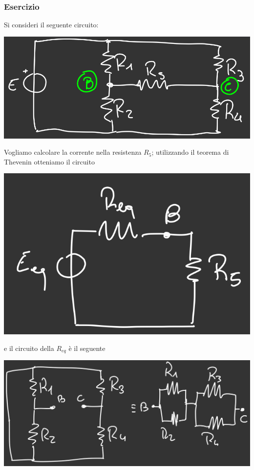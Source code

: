 \documentclass{article}
\begin{document}
\subsubsection{Esercizio}
Si consideri il seguente circuito:
\begin{center}
    \includegraphics[scale=0.33]{Image/Esercizio_Thevenin_1.png}
\end{center}
Vogliamo calcolare la corrente nella resistenza $R_5$; utilizzando il teorema di Thevenin otteniamo il circuito
\begin{center}
    \includegraphics[scale=0.33]{Image/Esercizio_Thevenin_2.png}
\end{center}
e il circuito della $R_{eq}$ è il seguente
\begin{center}
    \includegraphics[scale=0.33]{Image/Esercizio_Thevenin_3.png}
\end{center}
\end{document}
